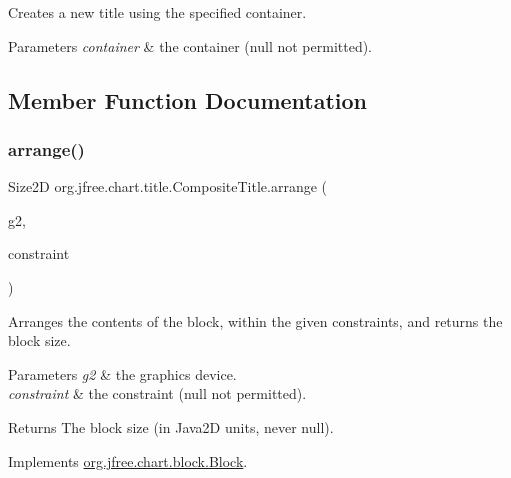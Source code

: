 Creates a new title using the specified container.


\begin{DoxyParams}{Parameters}
{\em container} & the container ({\ttfamily null} not permitted). \\
\hline
\end{DoxyParams}


\subsection{Member Function Documentation}
\mbox{\label{classorg_1_1jfree_1_1chart_1_1title_1_1_composite_title_a9f7d9c67faefcc8745d73da575bf731f}} 
\subsubsection{\texorpdfstring{arrange()}{arrange()}}
{\footnotesize\ttfamily Size2D org.\+jfree.\+chart.\+title.\+Composite\+Title.\+arrange (\begin{DoxyParamCaption}\item[{Graphics2D}]{g2,  }\item[{\mbox{\hyperlink{classorg_1_1jfree_1_1chart_1_1block_1_1_rectangle_constraint}{Rectangle\+Constraint}}}]{constraint }\end{DoxyParamCaption})}

Arranges the contents of the block, within the given constraints, and returns the block size.


\begin{DoxyParams}{Parameters}
{\em g2} & the graphics device. \\
\hline
{\em constraint} & the constraint ({\ttfamily null} not permitted).\\
\hline
\end{DoxyParams}
\begin{DoxyReturn}{Returns}
The block size (in Java2D units, never {\ttfamily null}). 
\end{DoxyReturn}


Implements \mbox{\hyperlink{interfaceorg_1_1jfree_1_1chart_1_1block_1_1_block_ab4cabbc237c5277a4a0018bab930e5fe}{org.\+jfree.\+chart.\+block.\+Block}}.

